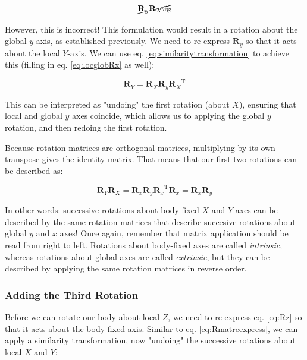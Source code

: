 \documentclass{article}
\begin{document}
\begin{equation}
    \cancel{\mathbf{R}_y \mathbf{R}_X \vec{v}_{\mathcal{B}}}
\end{equation}

However, this is incorrect! This formulation would result in a rotation about the global \( y\)-axis, as established previously. We need to re-express \( \mathbf{R}_y \) so that it acts about the local \(Y\)-axis. We can use eq. \ref{eq:similaritytransformation} to achieve this (filling in eq. \ref{eq:locglobRx} as well):

\begin{equation}
    \mathbf{R}_Y = \mathbf{R}_X \mathbf{R}_y {\mathbf{R}_X}^\mathrm{T}
    \label{eq:Rmatreexpress}
\end{equation}

This can be interpreted as "undoing" the first rotation (about \(X\)), ensuring that local and global \( y\) axes coincide, which allows us to applying the global \(y\) rotation, and then redoing the first rotation.

Because rotation matrices are orthogonal matrices, multiplying by its own transpose gives the identity matrix. That means that our first two rotations can be described as:

\begin{equation}
    \mathbf{R}_Y \mathbf{R}_X  = \mathbf{R}_x \mathbf{R}_y {\mathbf{R}_x}^\mathrm{T} \mathbf{R}_x = \mathbf{R}_x \mathbf{R}_y
    \label{eq:Rmatcancelout}
\end{equation}

In other words: successive rotations about body-fixed \( X\) and \(Y\) axes can be described by the same rotation matrices that describe succesive rotations about global \(y\) and \(x\) axes! Once again, remember that matrix application should be read from right to left. Rotations about body-fixed axes are called \emph{intrinsic}, whereas rotations about global axes are called \emph{extrinsic}, but they can be described by applying the same rotation matrices in reverse order.

\subsubsection*{Adding the Third Rotation}

Before we can rotate our body about local \(Z\), we need to re-express eq. \ref{eq:Rz} so that it acts about the body-fixed axis. Similar to eq. \ref{eq:Rmatreexpress}, we can apply a similarity transformation, now "undoing" the successive rotations about local \(X\) and \(Y\): 
\end{document}
